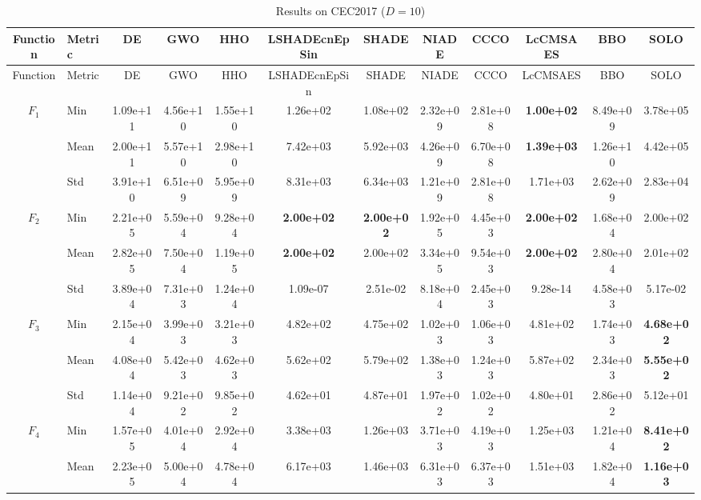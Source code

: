 \begin{center}
\small
\renewcommand{\arraystretch}{1.25}
\begin{longtable}{clcccccccccc}
\caption{Results on CEC2017 ($D=10$) }
\label{tab:results_CEC2017_10} \\
\toprule
Function & Metric & DE & GWO & HHO & LSHADEcnEpSin & SHADE & NIADE & CCCO & LcCMSAES & BBO & SOLO \\
\midrule
\endfirsthead
\toprule
Function & Metric & DE & GWO & HHO & LSHADEcnEpSin & SHADE & NIADE & CCCO & LcCMSAES & BBO & SOLO \\
\midrule
\endhead
\multirow{3}{*}{$F_{1}$} & Min & 1.09e+11 & 4.56e+10 & 1.55e+10 & 1.26e+02 & 1.08e+02 & 2.32e+09 & 2.81e+08 & \textbf{1.00e+02} & 8.49e+09 & 3.78e+05 \\
 & Mean & 2.00e+11 & 5.57e+10 & 2.98e+10 & 7.42e+03 & 5.92e+03 & 4.26e+09 & 6.70e+08 & \textbf{1.39e+03} & 1.26e+10 & 4.42e+05 \\
 & Std & 3.91e+10 & 6.51e+09 & 5.95e+09 & 8.31e+03 & 6.34e+03 & 1.21e+09 & 2.81e+08 & 1.71e+03 & 2.62e+09 & 2.83e+04 \\
\midrule
\multirow{3}{*}{$F_{2}$} & Min & 2.21e+05 & 5.59e+04 & 9.28e+04 & \textbf{2.00e+02} & \textbf{2.00e+02} & 1.92e+05 & 4.45e+03 & \textbf{2.00e+02} & 1.68e+04 & 2.00e+02 \\
 & Mean & 2.82e+05 & 7.50e+04 & 1.19e+05 & \textbf{2.00e+02} & 2.00e+02 & 3.34e+05 & 9.54e+03 & \textbf{2.00e+02} & 2.80e+04 & 2.01e+02 \\
 & Std & 3.89e+04 & 7.31e+03 & 1.24e+04 & 1.09e-07 & 2.51e-02 & 8.18e+04 & 2.45e+03 & 9.28e-14 & 4.58e+03 & 5.17e-02 \\
\midrule
\multirow{3}{*}{$F_{3}$} & Min & 2.15e+04 & 3.99e+03 & 3.21e+03 & 4.82e+02 & 4.75e+02 & 1.02e+03 & 1.06e+03 & 4.81e+02 & 1.74e+03 & \textbf{4.68e+02} \\
 & Mean & 4.08e+04 & 5.42e+03 & 4.62e+03 & 5.62e+02 & 5.79e+02 & 1.38e+03 & 1.24e+03 & 5.87e+02 & 2.34e+03 & \textbf{5.55e+02} \\
 & Std & 1.14e+04 & 9.21e+02 & 9.85e+02 & 4.62e+01 & 4.87e+01 & 1.97e+02 & 1.02e+02 & 4.80e+01 & 2.86e+02 & 5.12e+01 \\
\midrule
\multirow{3}{*}{$F_{4}$} & Min & 1.57e+05 & 4.01e+04 & 2.92e+04 & 3.38e+03 & 1.26e+03 & 3.71e+03 & 4.19e+03 & 1.25e+03 & 1.21e+04 & \textbf{8.41e+02} \\
 & Mean & 2.23e+05 & 5.00e+04 & 4.78e+04 & 6.17e+03 & 1.46e+03 & 6.31e+03 & 6.37e+03 & 1.51e+03 & 1.82e+04 & \textbf{1.16e+03} \\

\end{longtable}
\end{center}
